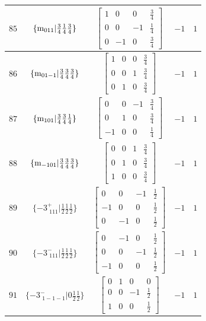 \documentclass[fleqn,8pt]{jsarticle}
\begin{document}
\begin{longtable}{ccccc}
$ 85 $ & $ \{{\rm m}_{011}|\frac{3}{4} \frac{1}{4} \frac{3}{4}\} $ & $ \begin{bmatrix} 1 & 0 & 0 & \frac{3}{4} \\ 0 & 0 & -1 & \frac{1}{4} \\ 0 & -1 & 0 & \frac{3}{4} \end{bmatrix} $ & $ -1 $ & $ 1 $ \\ \hline
$ 86 $ & $ \{{\rm m}_{01-1}|\frac{3}{4} \frac{3}{4} \frac{3}{4}\} $ & $ \begin{bmatrix} 1 & 0 & 0 & \frac{3}{4} \\ 0 & 0 & 1 & \frac{3}{4} \\ 0 & 1 & 0 & \frac{3}{4} \end{bmatrix} $ & $ -1 $ & $ 1 $ \\ \hline
$ 87 $ & $ \{{\rm m}_{101}|\frac{3}{4} \frac{3}{4} \frac{1}{4}\} $ & $ \begin{bmatrix} 0 & 0 & -1 & \frac{3}{4} \\ 0 & 1 & 0 & \frac{3}{4} \\ -1 & 0 & 0 & \frac{1}{4} \end{bmatrix} $ & $ -1 $ & $ 1 $ \\ \hline
$ 88 $ & $ \{{\rm m}_{-101}|\frac{3}{4} \frac{3}{4} \frac{3}{4}\} $ & $ \begin{bmatrix} 0 & 0 & 1 & \frac{3}{4} \\ 0 & 1 & 0 & \frac{3}{4} \\ 1 & 0 & 0 & \frac{3}{4} \end{bmatrix} $ & $ -1 $ & $ 1 $ \\ \hline
$ 89 $ & $ \{-3^{+}_{\,\,111}|\frac{1}{2} \frac{1}{2} \frac{1}{2}\} $ & $ \begin{bmatrix} 0 & 0 & -1 & \frac{1}{2} \\ -1 & 0 & 0 & \frac{1}{2} \\ 0 & -1 & 0 & \frac{1}{2} \end{bmatrix} $ & $ -1 $ & $ 1 $ \\ \hline
$ 90 $ & $ \{-3^{-}_{\,\,111}|\frac{1}{2} \frac{1}{2} \frac{1}{2}\} $ & $ \begin{bmatrix} 0 & -1 & 0 & \frac{1}{2} \\ 0 & 0 & -1 & \frac{1}{2} \\ -1 & 0 & 0 & \frac{1}{2} \end{bmatrix} $ & $ -1 $ & $ 1 $ \\ \hline
$ 91 $ & $ \{-3^{-}_{\,\,1-1-1}|0 \frac{1}{2} \frac{1}{2}\} $ & $ \begin{bmatrix} 0 & 1 & 0 & 0 \\ 0 & 0 & -1 & \frac{1}{2} \\ 1 & 0 & 0 & \frac{1}{2} \end{bmatrix} $ & $ -1 $ & $ 1 $ \\ \hline

\end{longtable}
\end{document}

